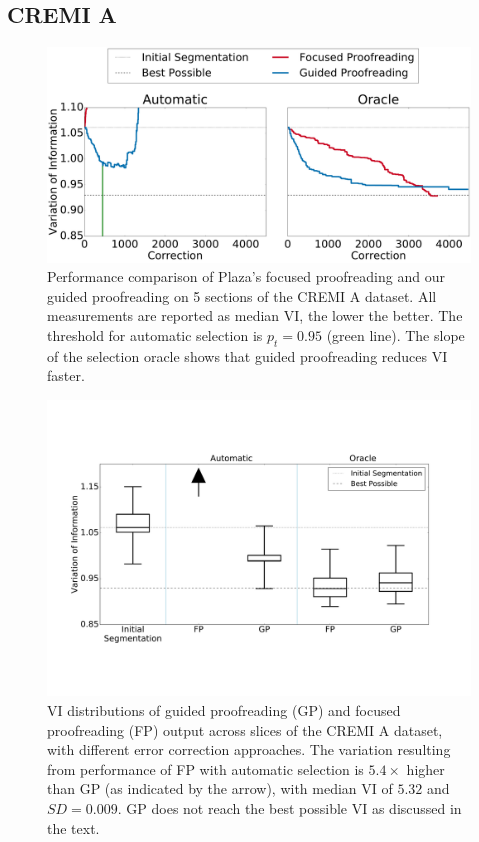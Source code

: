 \subsection{CREMI A}

\begin{figure}[t]
\centering
\includegraphics[width=\linewidth]{gfx/cremiA_trails.pdf}
\caption{Performance comparison of Plaza's focused proofreading and our guided proofreading on 5 sections of the CREMI A dataset. All measurements are reported as median VI, the lower the better. The threshold for automatic selection is $p_t=0.95$ (green line). The slope of the selection oracle shows that guided proofreading reduces VI faster.}
\label{fig:cremiAtrails}
\end{figure}

\begin{figure}[t]
\centering
\includegraphics[width=\linewidth]{gfx/cremiAboxplot.pdf}
\caption{VI distributions of guided proofreading (GP) and focused proofreading (FP) output across slices of the CREMI A dataset, with different error correction approaches. The variation resulting from performance of FP with automatic selection is $5.4\times$ higher than GP (as indicated by the arrow), with median VI of $5.32$ and $SD=0.009$. GP does not reach the best possible VI as discussed in the text.}
\label{fig:cremiAboxplot}
\end{figure}

